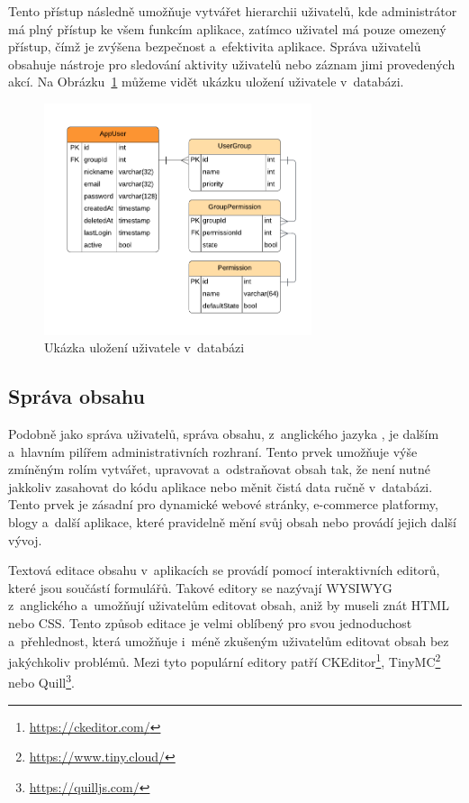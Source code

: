 Tento přístup následně umožňuje vytvářet hierarchii uživatelů, kde administrátor má plný přístup ke všem funkcím aplikace, zatímco uživatel má pouze omezený přístup, čímž je zvýšena bezpečnost a~efektivita aplikace. Správa uživatelů obsahuje nástroje pro sledování aktivity uživatelů nebo záznam jimi provedených akcí. Na Obrázku~\ref{fig:user-management} můžeme vidět ukázku uložení uživatele v~databázi.

\begin{figure}[H]
    \centering
    \includegraphics[width=0.7\textwidth]{diagrams/userManagement}
    \caption{Ukázka uložení uživatele v~databázi \cite{responsive_design}}
    \label{fig:user-management}
\end{figure}

\subsection{Správa obsahu}
\label{subsec:admin-elements-content-management}
Podobně jako správa uživatelů, správa obsahu, z~anglického jazyka \textit{}, je dalším a~hlavním pilířem administrativních rozhraní. Tento prvek umožňuje výše zmíněným rolím vytvářet, upravovat a~odstraňovat obsah tak, že není nutné jakkoliv zasahovat do kódu aplikace nebo měnit čistá data ručně v~databázi. Tento prvek je zásadní pro dynamické webové stránky, e-commerce platformy, blogy a~další aplikace, které pravidelně mění svůj obsah nebo provádí jejich další vývoj.

Textová editace obsahu v~aplikacích se provádí pomocí interaktivních editorů, které jsou součástí formulářů. Takové editory se nazývají WYSIWYG z~anglického \textit{} a~umožňují uživatelům editovat obsah, aniž by museli znát HTML nebo CSS. Tento způsob editace je velmi oblíbený pro svou jednoduchost a~přehlednost, která umožňuje i~méně zkušeným uživatelům editovat obsah bez jakýchkoliv problémů. Mezi tyto populární editory patří CKEditor\footnote[1]{\url{https://ckeditor.com/}}, TinyMC\footnote[2]{\url{https://www.tiny.cloud/}} nebo Quill\footnote[3]{\url{https://quilljs.com/}}.

